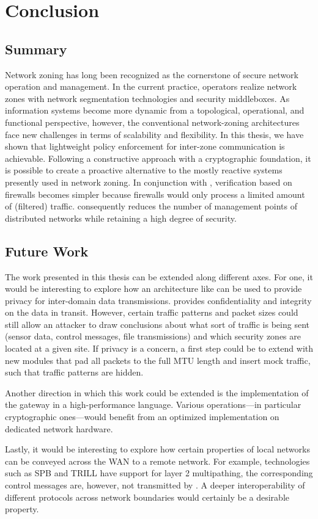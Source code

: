 \chapter{Conclusion}
\label{concl}

\section{Summary}
\label{ssummary}

Network zoning has long been recognized as the cornerstone of secure network
operation and management. In the current practice, operators realize network
zones with network segmentation technologies and security middleboxes. As
information systems become more dynamic from a topological, operational, and
functional perspective, however, the conventional network-zoning architectures
face new challenges in terms of scalability and flexibility. In this thesis, we
have shown that lightweight policy enforcement for inter-zone communication is
achievable. Following a constructive approach with a cryptographic foundation,
it is possible to create a proactive alternative to the mostly reactive systems
presently used in network zoning. In conjunction with \name, verification based
on firewalls becomes simpler because firewalls would only process a limited
amount of (filtered) traffic. \name consequently reduces the number of
management points of distributed networks while retaining a high degree of
security.

\section{Future Work}
\label{sfuture}

The work presented in this thesis can be extended along different axes. For
one, it would be interesting to explore how an architecture like \name can be
used to provide privacy for inter-domain data transmissions. \name provides
confidentiality and integrity on the data in transit. However, certain traffic
patterns and packet sizes could still allow an attacker to draw conclusions about
what sort of traffic is being sent (\eg sensor data, control messages, file
transmissions) and which security zones are located
at a given site. If privacy is a concern, a first step could be to extend \tps
with new modules that pad all packets to the full MTU length and insert mock
traffic, such that traffic patterns are hidden.

Another direction in which this work could be extended is the implementation
of the \tp gateway in a high-performance language. Various operations---in
particular cryptographic ones---would benefit from an optimized
implementation on dedicated network hardware.

Lastly, it would be interesting to explore how certain properties of local
networks can be conveyed across the WAN to a remote network. For example, technologies such as
SPB and TRILL have support for layer 2 multipathing, the corresponding control
messages are, however, not transmitted by \name. A deeper interoperability of
different protocols across network boundaries would certainly be a desirable property.
